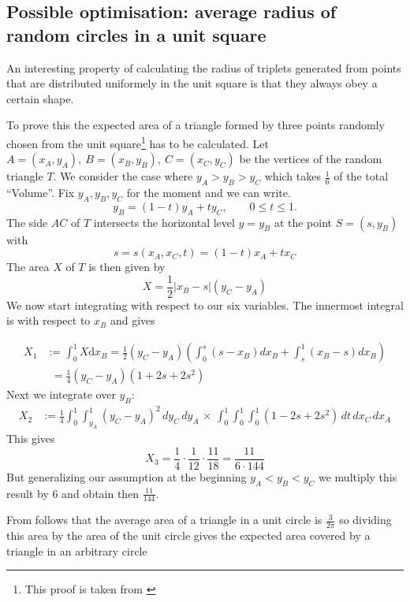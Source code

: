 \documentclass[11pt]{scrreprt}
\begin{document}

\subsection{Possible optimisation: average radius of random circles in a unit square} %
\label{ssub:average_radius_of_random_circles_in_a_unit_square}
An interesting property of calculating the radius of triplets generated from points that are distributed uniformely in the unit square is 
that they always obey a certain shape.

To prove this the expected area of a triangle formed by three points randomly chosen from the unit square\footnote{This proof is taken
from \cite{Blatter:2015}} has to be calculated. Let \( A = (x_A, y_A),\ B = (x_B, y_B),\ C = (x_C, y_C)\) be the vertices of the random triangle \( T \). We consider the case where \( y_A
> y_B > y_C \) which takes $\frac{1}{6}$ of the total ``Volume''. Fix \( y_A, y_B, y_C \) for the moment and we can write.
\[
  y_B = (1-t)y_A + ty_C, \qquad 0 \leq t \leq 1.
\]
The side $AC$ of $T$ intersects the horizontal level $y=y_B$ at the point $S=(s,y_B)$ with
\begin{equation}
  s = s(x_A,x_C,t) = (1-t)x_A + tx_C
\end{equation}
The area $X$ of $T$ is then given by
\[
  X = \frac{1}{2}\lvert x_B - s\rvert(y_C - y_A)
\]
We now start integrating with respect to our six variables. The innermost integral is with respect to $x_B$ and gives

\begin{align}
  X_1 &:= \int_0^1X\text{d}x_B=\frac{1}{2}(y_C-y_A)\left( \int_0^s(s-x_B)dx_B + \int_s^1(x_B-s)dx_B\right)\nonumber\\
      &\phantom{:}= \frac{1}{4}(y_C-y_A)(1+2s+2s^2)\nonumber
\end{align}
Next we integrate over $y_B$:
\begin{align}
  X_2 &:= \frac{1}{4}\int_0^1\int_{y_A}^1(y_C-y_A)^2\,dy_C\,dy_A\,\times\,\int_0^1\int_0^1\int_0^1(1-2s+2s^2)\,dt\,dx_C\,dx_A  \nonumber
\end{align}
This gives
\[
  X_3 = \frac{1}{4}\cdot \frac{1}{12} \cdot \frac{11}{18} = \frac{11}{6\cdot144}
\]
But generalizing our assumption at the beginning $y_A < y_B < y_C$ we multiply this result by $6$ and obtain then $\frac{11}{144}$.

From \cite{Weisstein2016} follows that the average area of a triangle in a unit circle is $\frac{3}{2\pi}$ so dividing this area by the
area of the unit circle gives the expected area covered by a triangle in an arbitrary circle
\end{document}
